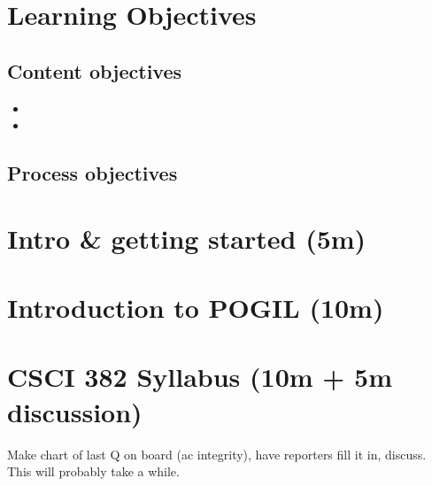 \documentclass{tufte-handout}
\begin{document}
\section{Learning Objectives}

\subsection{Content objectives}

\begin{itemize}
\item \lobjectiveA
\item \lobjectiveB
\end{itemize}

\subsection{Process objectives}

\section{Intro \& getting started (5m)}

\section{Introduction to POGIL (10m)}

\section{CSCI 382 Syllabus (10m + 5m discussion)}

Make chart of last Q on board (ac integrity), have reporters fill it
in, discuss.  This will probably take a while.
\end{document}
